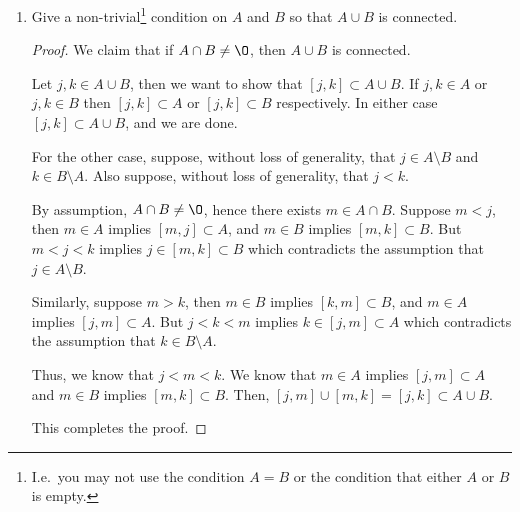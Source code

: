\documentclass[11pt]{article}
\renewcommand{\emptyset}{\O}
\theoremstyle{definition}
\numberwithin{equation}{section}
\begin{document}
\begin{enumerate}
\begin{enumerate}
\begin{proof}
Case 2: $|A \cap B|=1$. Then, let $m$ be the only element in $A \cap B$. Then, $A \cap B =[m,m]$ is a degenerate interval and we are done.

Case 3: $|A \cap B| \geq 2$. Then, let $x,y \in A \cap B$ with $x<y$ without loss of generality. Since $x,y \in A$, and we know that $A$ is an interval, we have that $[x,y] \subset A$. Similarly, since $x,y \in B$, and we know that $B$ is an interval, we have that $[x,y] \subset B$. Then, $[x,y] \subset A \cap B$, hence $A \cap B$ is an interval, and we are done.

\renewcommand\qedsymbol{QED}
\end{proof}

	\item Give a non-trivial\footnote{I.e.~you may not use the condition $A = B$ or the condition that either $A$ or $B$ is empty.} condition on $A$ and $B$ so that $A\cup B$ is connected.
\begin{proof}
We claim that if $A \cap B \neq \emptyset$, then $A \cup B$ is connected.

Let $j,k \in A \cup B$, then we want to show that $[j,k] \subset A \cup B$. If $j,k \in A$ or $j,k \in B$ then $[j,k] \subset A$ or $[j,k] \subset B$ respectively. In either case $[j,k] \subset A \cup B$, and we are done.

For the other case, suppose, without loss of generality, that $j \in A\setminus B$ and $k \in B \setminus A$. Also suppose, without loss of generality, that $j < k$. 

By assumption, $A \cap B \neq \emptyset$, hence there exists $m\in A\cap B$. Suppose $m<j$, then $m \in A$ implies $[m,j] \subset A$, and $m \in B$ implies $[m,k] \subset B$. But $m<j<k$ implies $j \in [m,k] \subset B$ which contradicts the assumption that $j \in A \setminus B$. 

Similarly, suppose $m>k$, then $m \in B$ implies $[k,m] \subset B$, and $m \in A$ implies $[j,m] \subset A$. But $j<k<m$ implies $k \in [j,m] \subset A$ which contradicts the assumption that $k \in B \setminus A$. 

Thus, we know that $j<m<k$. We know that $m \in A$ implies $[j,m] \subset A$ and $m \in B$ implies $[m,k] \subset B$. Then, $[j,m] \cup [m,k] = [j,k] \subset A \cup B$. 

This completes the proof.

\renewcommand\qedsymbol{QED}
\end{proof}

\end{enumerate}


\end{enumerate}
\end{document}
